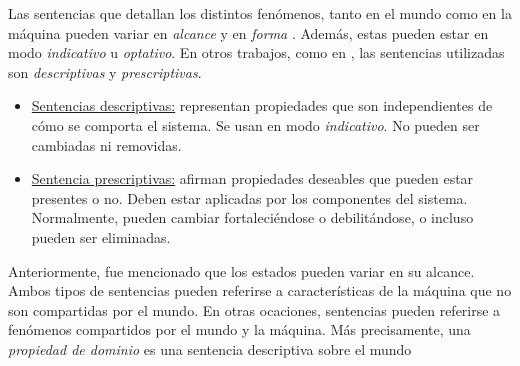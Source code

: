Las sentencias que detallan los distintos fenómenos, tanto en el mundo como en la máquina pueden variar en
\emph{alcance} y en \emph{forma} \cite{Parnas95functionaldocuments,Jackson:1995:SRA:210207}. Además, estas pueden estar en modo \emph{indicativo} u \emph{optativo}. En
otros trabajos, como en \cite{van2009requirements}, las sentencias utilizadas son \emph{descriptivas} y \emph{prescriptivas}.

\begin{itemize}
    \item \underline{Sentencias descriptivas:} representan propiedades que son independientes de cómo se comporta el
    sistema. Se usan en modo \emph{indicativo}. No pueden ser cambiadas ni removidas.
    \item \underline{Sentencia prescriptivas:} afirman propiedades deseables que pueden estar presentes o no. Deben estar
    aplicadas por los componentes del sistema. Normalmente, pueden cambiar fortaleciéndose o debilitándose, o incluso
    pueden ser eliminadas. 
\end{itemize}

Anteriormente, fue mencionado que los estados pueden variar en su alcance. Ambos tipos de sentencias pueden referirse a
características de la máquina que no son compartidas por el mundo. En otras ocaciones, sentencias pueden referirse a
fenómenos compartidos por el mundo y la máquina. Más precisamente, una \emph{propiedad de dominio} es
una sentencia descriptiva sobre el mundo
